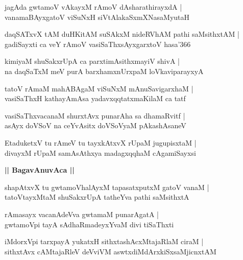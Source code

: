 \documentclass[twoside,12pt,openright]{book}
\newcounter{shloka}[chapter]
\def\uvaca#1{\centerline{{\large\textbf{#1}}}}
\begin{document}
\begin{shloka}%
jagAda gwtamoV vAkayxM rAmoV dAsharathirayxdA |\\
vanamaBAyxgatoV viSuNxH siVtAlakaSxmXNasaMyutaH 
\end{shloka}

\begin{shloka}%
daqSATxvX tAM duHKitAM suSAkxM nideRVhAM pathi saMsithxtAM |\\
gadiSayxti ca veY rAmoV vasiSaThxsAyxgarxtoV hasa\char'366
\end{shloka}

\begin{shloka}%
kimiyaM shuSakxrUpA ca parxtimAsithxmayiV shivA |\\
na daqSaTxM meV purA barxhamxnUrxpaM loVkaviparayxyA 
\end{shloka}

\begin{shloka}%
tatoV rAmaM mahABAgaM viSuNxM mAnuSavigarxhaM |\\
vasiSaThxH kathayAmAsa yadavxqqtatxmaKilaM ca tatf
\end{shloka}

\begin{shloka}%
vasiSaThxvacanaM shurxtAvx punarAha sa dhamaRvitf |\\
asAyx doVSoV na ceYvAsitx doVSoVyaM pAkashAsaneV
\end{shloka}

\begin{shloka}%
EtaduketxV tu rAmeV tu tayxkAtxvX rUpaM jugupisxtaM |\\
divayxM rUpaM samAsAthxya madagxqqhaM cAgamiSayxsi
\end{shloka}

\uvaca{|| BagavAnuvAca ||}

\begin{shloka}%
shapAtxvX tu gwtamoVhalAyxM tapasatxputxM gatoV vanaM |\\
tatoVtayxMtaM shuSakxrUpA tatheYva pathi saMsithxtA
\end{shloka}

\begin{shloka}%
rAmasayx vacanAdeVva gwtamaM punarAgatA |\\
gwtamoVpi tayA sAdhaRmadeyxYvaM divi tiSaThxti 
\end{shloka}

\begin{shloka}%
iMdorxVpi tarxpayA yukatxH sithxtashAcxMtajaRlaM ciraM |\\
sithxtAvx cAMtajaRleV deVviVM aswtxdiMdArxkiSxsaMjicnxtAM 
\end{shloka}
\end{document}
